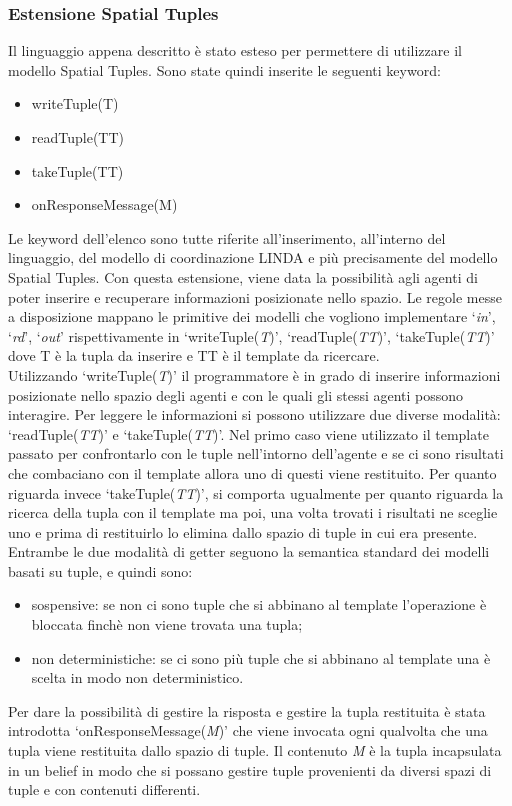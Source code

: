 \subsubsection{Estensione Spatial Tuples}
Il linguaggio appena descritto \`e stato esteso per permettere di utilizzare il modello Spatial Tuples. Sono state quindi inserite le seguenti keyword:
\begin{itemize}
\item writeTuple(T)
\item readTuple(TT)
\item takeTuple(TT)
\item onResponseMessage(M)
\end{itemize}
Le keyword dell'elenco sono tutte riferite all'inserimento, all'interno del linguaggio, del modello di coordinazione LINDA e pi\`u precisamente del modello Spatial Tuples.
Con questa estensione, viene data la possibilit\`a agli agenti di poter inserire e recuperare informazioni posizionate nello spazio. Le regole messe a disposizione mappano le primitive dei modelli che vogliono implementare `\textit{in}', `\textit{rd}', `\textit{out}' rispettivamente in `writeTuple(\textit{T})', `readTuple(\textit{TT})', `takeTuple(\textit{TT})' dove T \`e la tupla da inserire e TT \`e il template da ricercare.
\\
Utilizzando `writeTuple(\textit{T})' il programmatore \`e in grado di inserire informazioni posizionate nello spazio degli agenti e con le quali gli stessi agenti possono interagire. Per leggere le informazioni si possono utilizzare due diverse modalit\`a: `readTuple(\textit{TT})' e `takeTuple(\textit{TT})'. Nel primo caso viene utilizzato il template passato per confrontarlo con le tuple nell'intorno dell'agente e se ci sono risultati che combaciano con il template allora uno di questi viene restituito. Per quanto riguarda invece `takeTuple(\textit{TT})', si comporta ugualmente per quanto riguarda la ricerca della tupla con il template ma poi, una volta trovati i risultati ne sceglie uno e prima di restituirlo lo elimina dallo spazio di tuple in cui era presente.
\\
Entrambe le due modalit\`a di getter seguono la semantica standard dei modelli basati su tuple, e quindi sono:
\begin{itemize}
\item sospensive: se non ci sono tuple che si abbinano al template l'operazione \`e bloccata finch\`e non viene trovata una tupla;
\item non deterministiche: se ci sono pi\`u tuple che si abbinano al template una \`e scelta in modo non deterministico.
\end{itemize}
Per dare la possibilit\`a di gestire la risposta e gestire la tupla restituita \`e stata introdotta `onResponseMessage(\textit{M})' che viene invocata ogni qualvolta che una tupla viene restituita dallo spazio di tuple. Il contenuto \textit{M} \`e la tupla incapsulata in un belief in modo che si possano gestire tuple provenienti da diversi spazi di tuple e con contenuti differenti.

